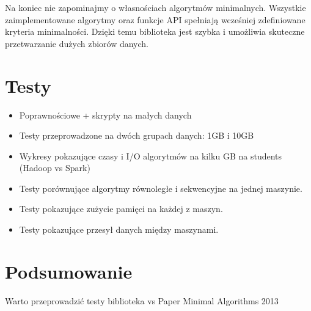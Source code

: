 \documentclass{pracamgr}
\begin{document}
Na koniec nie zapominajmy o własnościach algorytmów minimalnych. Wszystkie zaimplementowane algorytmy oraz funkcje API spełniają wcześniej zdefiniowane kryteria minimalności. Dzięki temu biblioteka jest szybka i umożliwia skuteczne przetwarzanie dużych zbiorów danych.

\chapter{Testy}

\begin{itemize}
    \item Poprawnościowe + skrypty na małych danych
    \item Testy przeprowadzone na dwóch grupach danych: 1GB i 10GB
    \item Wykresy pokazujące czasy i I/O algorytmów na kilku GB na students (Hadoop vs Spark)
    \item Testy porównujące algorytmy równoległe i sekwencyjne na jednej maszynie.
    \item Testy pokazujące zużycie pamięci na każdej z maszyn.
    \item Testy pokazujące przesył danych między maszynami.
\end{itemize}

\chapter{Podsumowanie}

Warto przeprowadzić testy biblioteka vs Paper Minimal Algorithms 2013



\end{document}
